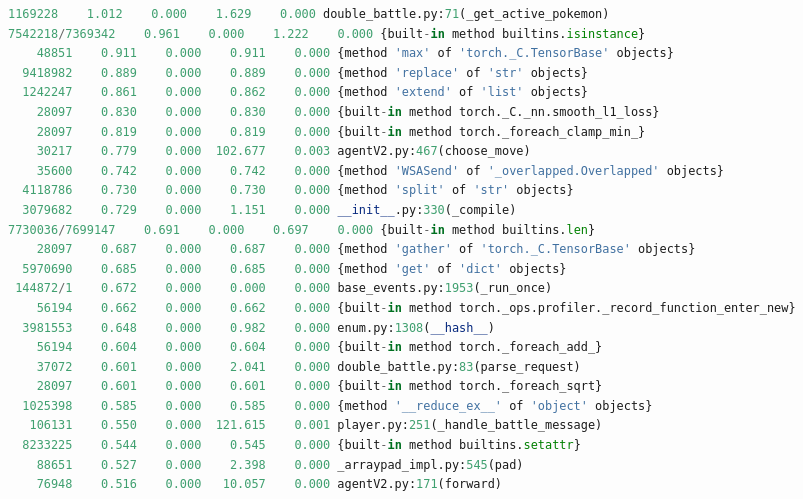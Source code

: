 \begin{changemargin}{-2cm}{-2cm}
\begin{lstlisting}[basicstyle=\fontsize{8}{8}\selectfont\ttfamily,language=Python,caption={Excerpt of Poke-env implementation cProfile sorted by time.}]
  1169228    1.012    0.000    1.629    0.000 double_battle.py:71(_get_active_pokemon)
7542218/7369342    0.961    0.000    1.222    0.000 {built-in method builtins.isinstance}
    48851    0.911    0.000    0.911    0.000 {method 'max' of 'torch._C.TensorBase' objects}
  9418982    0.889    0.000    0.889    0.000 {method 'replace' of 'str' objects}
  1242247    0.861    0.000    0.862    0.000 {method 'extend' of 'list' objects}
    28097    0.830    0.000    0.830    0.000 {built-in method torch._C._nn.smooth_l1_loss}
    28097    0.819    0.000    0.819    0.000 {built-in method torch._foreach_clamp_min_}
    30217    0.779    0.000  102.677    0.003 agentV2.py:467(choose_move)
    35600    0.742    0.000    0.742    0.000 {method 'WSASend' of '_overlapped.Overlapped' objects}
  4118786    0.730    0.000    0.730    0.000 {method 'split' of 'str' objects}
  3079682    0.729    0.000    1.151    0.000 __init__.py:330(_compile)
7730036/7699147    0.691    0.000    0.697    0.000 {built-in method builtins.len}
    28097    0.687    0.000    0.687    0.000 {method 'gather' of 'torch._C.TensorBase' objects}
  5970690    0.685    0.000    0.685    0.000 {method 'get' of 'dict' objects}
 144872/1    0.672    0.000    0.000    0.000 base_events.py:1953(_run_once)
    56194    0.662    0.000    0.662    0.000 {built-in method torch._ops.profiler._record_function_enter_new}
  3981553    0.648    0.000    0.982    0.000 enum.py:1308(__hash__)
    56194    0.604    0.000    0.604    0.000 {built-in method torch._foreach_add_}
    37072    0.601    0.000    2.041    0.000 double_battle.py:83(parse_request)
    28097    0.601    0.000    0.601    0.000 {built-in method torch._foreach_sqrt}
  1025398    0.585    0.000    0.585    0.000 {method '__reduce_ex__' of 'object' objects}
   106131    0.550    0.000  121.615    0.001 player.py:251(_handle_battle_message)
  8233225    0.544    0.000    0.545    0.000 {built-in method builtins.setattr}
    88651    0.527    0.000    2.398    0.000 _arraypad_impl.py:545(pad)
    76948    0.516    0.000   10.057    0.000 agentV2.py:171(forward)

\end{lstlisting}
\end{changemargin}
\clearpage